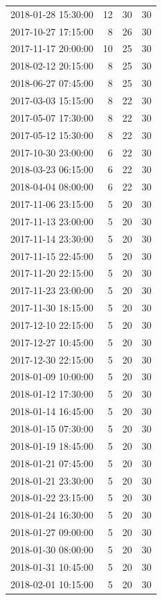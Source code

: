 \begin{tabular}{lrrr}
2018-01-28 15:30:00 & 12 & 30 & 30 \\
2017-10-27 17:15:00 & 8 & 26 & 30 \\
2017-11-17 20:00:00 & 10 & 25 & 30 \\
2018-02-12 20:15:00 & 8 & 25 & 30 \\
2018-06-27 07:45:00 & 8 & 25 & 30 \\
2017-03-03 15:15:00 & 8 & 22 & 30 \\
2017-05-07 17:30:00 & 8 & 22 & 30 \\
2017-05-12 15:30:00 & 8 & 22 & 30 \\
2017-10-30 23:00:00 & 6 & 22 & 30 \\
2018-03-23 06:15:00 & 6 & 22 & 30 \\
2018-04-04 08:00:00 & 6 & 22 & 30 \\
2017-11-06 23:15:00 & 5 & 20 & 30 \\
2017-11-13 23:00:00 & 5 & 20 & 30 \\
2017-11-14 23:30:00 & 5 & 20 & 30 \\
2017-11-15 22:45:00 & 5 & 20 & 30 \\
2017-11-20 22:15:00 & 5 & 20 & 30 \\
2017-11-23 23:00:00 & 5 & 20 & 30 \\
2017-11-30 18:15:00 & 5 & 20 & 30 \\
2017-12-10 22:15:00 & 5 & 20 & 30 \\
2017-12-27 10:45:00 & 5 & 20 & 30 \\
2017-12-30 22:15:00 & 5 & 20 & 30 \\
2018-01-09 10:00:00 & 5 & 20 & 30 \\
2018-01-12 17:30:00 & 5 & 20 & 30 \\
2018-01-14 16:45:00 & 5 & 20 & 30 \\
2018-01-15 07:30:00 & 5 & 20 & 30 \\
2018-01-19 18:45:00 & 5 & 20 & 30 \\
2018-01-21 07:45:00 & 5 & 20 & 30 \\
2018-01-21 23:30:00 & 5 & 20 & 30 \\
2018-01-22 23:15:00 & 5 & 20 & 30 \\
2018-01-24 16:30:00 & 5 & 20 & 30 \\
2018-01-27 09:00:00 & 5 & 20 & 30 \\
2018-01-30 08:00:00 & 5 & 20 & 30 \\
2018-01-31 10:45:00 & 5 & 20 & 30 \\
2018-02-01 10:15:00 & 5 & 20 & 30 \\

\end{tabular}
